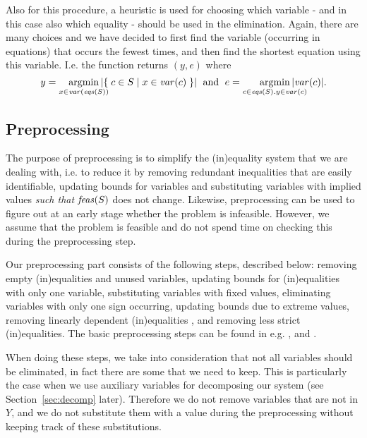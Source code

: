 Also for this procedure, a heuristic is used for choosing which variable - and in this case also which equality - should be used in the elimination. Again, there are many choices and we have decided to %
first find the variable (occurring in equations) that occurs the fewest times, and then find the shortest equation using this variable. I.e. the function  returns $(y,e)$ where
\[
y = \smashoperator[r]{\argmin_{x\in \var(\eqs(S))}}|\set{c\in S}{x\in \var(c)}|\; \text{ and }\; e = \smashoperator[r]{\argmin_{c\in \eqs(S).y\in \var(c)}}|\var(c)|.
\] 

\subsection{Preprocessing}
The purpose of preprocessing is to simplify the (in)equality system that we are dealing with, i.e. to reduce it by removing redundant inequalities that are easily identifiable, updating bounds for variables and substituting variables with implied values \emph{such that} $\mathit{feas}(S)$ does not change. {Likewise, preprocessing can be used to figure out at an early stage whether the problem is infeasible. However, we assume that the problem is feasible and do not spend time on checking this during the preprocessing step.}

Our preprocessing part consists of the following steps, described below: removing empty (in)equalities and unused variables, updating bounds for (in)\-equali\-ties with only one variable, substituting variables with fixed values, eliminating variables with only one sign occurring, updating bounds due to extreme values, removing linearly dependent (in)equalities \cite{lassez93}, and removing less strict (in)equalities. The basic preprocessing steps can be found in e.g. \cite{brearley75}, \cite{andersen95} and \cite{maros}.

When doing these steps, we take into consideration that not all variables should be eliminated, in fact there are some that we need to keep. This is particularly the case when we use auxiliary variables for decomposing our system (see Section~\ref{sec:decomp} later). Therefore we do not remove variables that are not in $Y$, and we do not substitute them with a value during the preprocessing {without keeping track of these substitutions}. 
%
